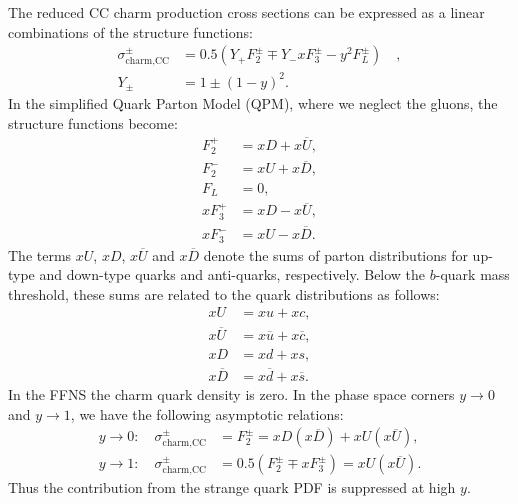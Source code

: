 \documentclass[pdftex,twocolumn,epjc3]{svjour3}          %
\begin{document}
The reduced CC charm production cross sections can be expressed as a
linear combinations of the structure functions:
\begin{equation}
\begin{split}
    \sigma^{\pm}_{\text{charm,CC}} &= 0.5(Y_{+}F_2^{\pm} \mp Y_{-}xF_3^{\pm} - y^2F_L^{\pm}) \quad ,\\[10pt]
    Y_{\pm} &= 1 \pm (1-y)^2.
\end{split}
\end{equation}
In the simplified Quark Parton Model (QPM), where we neglect the  gluons, the structure functions become:
\begin{equation}
\begin{split}
    F_2^{+} &= xD + x\overline{U}, \\
    F_2^{-} &= xU + x\overline{D},\\
    F_L &= 0,\\
    xF_3^{+} &= xD - x\overline{U}, \\
    xF_3^{-} &= xU - x\overline{D}.
\end{split}
\end{equation}
The terms $xU$, $xD$, $x\overline{U}$ and $x\overline{D}$ denote the
sums of parton distributions for up-type and down-type quarks and
anti-quarks, respectively.  Below the $b$-quark mass threshold, these
sums are related to the quark distributions as follows:
\begin{equation}
\begin{split}
 xU &= xu + xc , \\
 x\overline{U} &= x\overline{u} + x\overline{c} , \\
 xD &= xd + xs , \\
 x\overline{D} &= x\overline{d} + x\overline{s}.
\end{split}
\end{equation}
In the FFNS the charm quark density is zero.
In the phase space corners $y \to 0$ and $y \to 1$, we have the following asymptotic relations:
\begin{equation}
\begin{split}
 y \to 0: \quad \sigma^{\pm}_{\text{charm,CC}} &= F_2^{\pm} = xD(x\overline{D}) + xU(x\overline{U}), \\[10pt]
 y \to 1: \quad \sigma^{\pm}_{\text{charm,CC}} &= 0.5(F_2^{\pm} \mp xF_3^{\pm}) = xU (x\overline{U}).
\label{eq:y01}
\end{split}
\end{equation}
Thus the contribution from the strange quark PDF is suppressed at high $y$.
\end{document}
